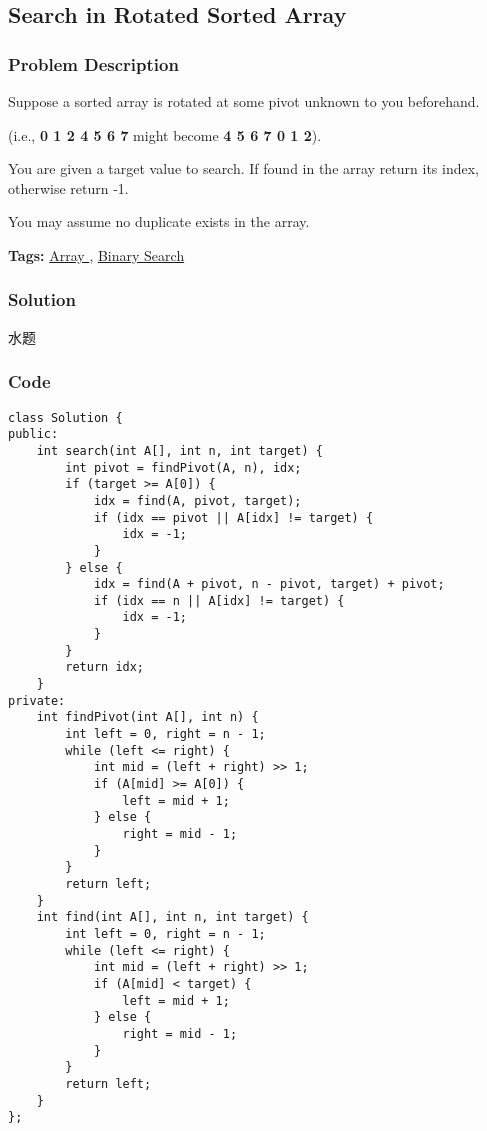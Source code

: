 \documentclass{article}
\begin{document}
\begin{CJK*}{UTF8}{gkai}
\subsection{ Search in Rotated Sorted Array }
\label{ Search in Rotated Sorted Array }

\subsubsection*{Problem Description}
Suppose a sorted array is rotated at some pivot unknown to you beforehand.

(i.e., \textbf{0 1 2 4 5 6 7} might become \textbf{4 5 6 7 0 1 2}).

You are given a target value to search. If found in the array return its index, otherwise return -1.

You may assume no duplicate exists in the array.


\textbf{Tags: }
\hyperref[ Array ]{ Array },  \hyperref[ Binary Search ]{ Binary Search }



\subsubsection*{Solution}
水题

\subsubsection*{Code}
\begin{lstlisting}
class Solution {
public:
    int search(int A[], int n, int target) {
        int pivot = findPivot(A, n), idx;
        if (target >= A[0]) {
            idx = find(A, pivot, target);
            if (idx == pivot || A[idx] != target) {
                idx = -1;
            }
        } else {
            idx = find(A + pivot, n - pivot, target) + pivot;
            if (idx == n || A[idx] != target) {
                idx = -1;
            }
        }
        return idx;
    }
private:
    int findPivot(int A[], int n) {
        int left = 0, right = n - 1;
        while (left <= right) {
            int mid = (left + right) >> 1;
            if (A[mid] >= A[0]) {
                left = mid + 1;
            } else {
                right = mid - 1;
            }
        }
        return left;
    }
    int find(int A[], int n, int target) {
        int left = 0, right = n - 1;
        while (left <= right) {
            int mid = (left + right) >> 1;
            if (A[mid] < target) {
                left = mid + 1;
            } else {
                right = mid - 1;
            }
        }
        return left;
    }
}; 
\end{lstlisting}



\end{CJK*}
\end{document}
